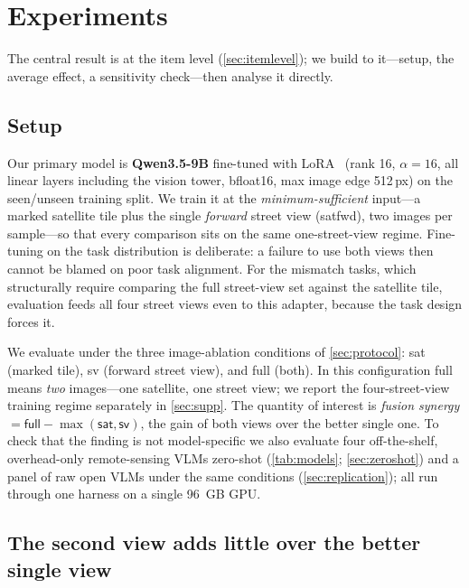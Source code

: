\section{Experiments}
\label{sec:results}

The central result is at the item level (\cref{sec:itemlevel}); we build to
it---setup, the average effect, a sensitivity check---then analyse it directly.

\subsection{Setup}
\label{sec:setup}
Our primary model is \textbf{Qwen3.5-9B} fine-tuned with
LoRA~\cite{lora_2022} (rank \num{16}, $\alpha=\num{16}$, all linear layers including
the vision tower, bfloat16, max image edge \num{512}\,px) on the seen/unseen
training split. We train it at the \emph{minimum-sufficient} input---a marked
satellite tile plus the single \emph{forward} street view (\textsf{satfwd}), two
images per sample---so that every comparison sits on the same one-street-view
regime. Fine-tuning on the task distribution is deliberate: a failure to use both
views then cannot be blamed on poor task alignment.
For the mismatch tasks, which structurally require comparing the full street-view
set against the satellite tile, evaluation feeds all four street views even to this
adapter, because the task design forces it.

We evaluate under the three image-ablation conditions of \cref{sec:protocol}:
\textsf{sat} (marked tile), \textsf{sv} (forward street view), and \textsf{full}
(both). In this configuration \textsf{full} means \emph{two} images---one satellite,
one street view; we report the four-street-view training regime separately in
\cref{sec:supp}. The quantity of interest is \emph{fusion synergy}
$=\textsf{full}-\max(\textsf{sat},\textsf{sv})$, the gain of both views over the
better single one. To check that the finding is not model-specific we also evaluate
four off-the-shelf, overhead-only remote-sensing VLMs zero-shot (\cref{tab:models};
\cref{sec:zeroshot}) and a panel of raw open VLMs under the same conditions
(\cref{sec:replication}); all run through one harness on a single \SI{96}{GB} GPU.

\subsection{The second view adds little over the better single view}
\label{sec:main}


